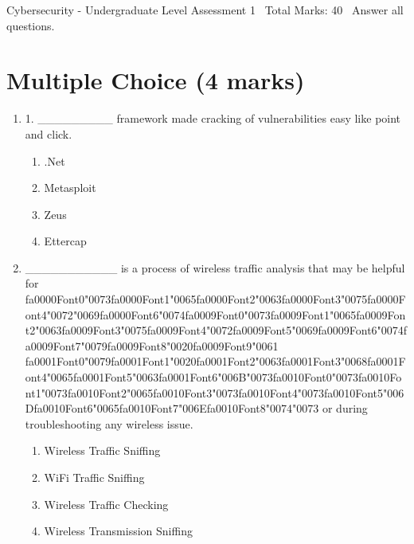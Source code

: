 \documentclass[12pt]{article}
\begin{document}
\begin{center}
Cybersecurity - Undergraduate Level Assessment 1 \
Total Marks: 40 \
Answer all questions.
\end{center}

\section*{Multiple Choice (4 marks)}
\begin{enumerate}[label=\arabic*.]
\item 1. \_\_\_\_\_\_\_\_\_ framework made cracking of vulnerabilities easy like point and click.
\begin{enumerate}[label=(\alph*)]
    \item .Net
    \item Metasploit
    \item Zeus
    \item Ettercap
\end{enumerate}
\item \_\_\_\_\_\_\_\_\_\_\_ is a process of wireless traffic analysis that may be helpful for {\csname fa0000Font0\endcsname\char"0073}{\csname fa0000Font1\endcsname\char"0065}{\csname fa0000Font2\endcsname\char"0063}{\csname fa0000Font3\endcsname\char"0075}{\csname fa0000Font4\endcsname\char"0072}{\char"0069}{\csname fa0000Font6\endcsname\char"0074}{\csname fa0009Font0\endcsname\char"0073}{\csname fa0009Font1\endcsname\char"0065}{\csname fa0009Font2\endcsname\char"0063}{\csname fa0009Font3\endcsname\char"0075}{\csname fa0009Font4\endcsname\char"0072}{\csname fa0009Font5\endcsname\char"0069}{\csname fa0009Font6\endcsname\char"0074}{\csname fa0009Font7\endcsname\char"0079}{\csname fa0009Font8\endcsname\char"0020}{\csname fa0009Font9\endcsname\char"0061} {\csname fa0001Font0\endcsname\char"0079}{\csname fa0001Font1\endcsname\char"0020}{\csname fa0001Font2\endcsname\char"0063}{\csname fa0001Font3\endcsname\char"0068}{\csname fa0001Font4\endcsname\char"0065}{\csname fa0001Font5\endcsname\char"0063}{\csname fa0001Font6\endcsname\char"006B}{\char"0073}{\csname fa0010Font0\endcsname\char"0073}{\csname fa0010Font1\endcsname\char"0073}{\csname fa0010Font2\endcsname\char"0065}{\csname fa0010Font3\endcsname\char"0073}{\csname fa0010Font4\endcsname\char"0073}{\csname fa0010Font5\endcsname\char"006D}{\csname fa0010Font6\endcsname\char"0065}{\csname fa0010Font7\endcsname\char"006E}{\csname fa0010Font8\endcsname\char"0074}{\char"0073} or during troubleshooting any wireless issue.
\begin{enumerate}[label=(\alph*)]
    \item Wireless Traffic Sniffing
    \item WiFi Traffic Sniffing
    \item Wireless Traffic Checking
    \item Wireless Transmission Sniffing
\end{enumerate}
\end{enumerate}
\end{document}
